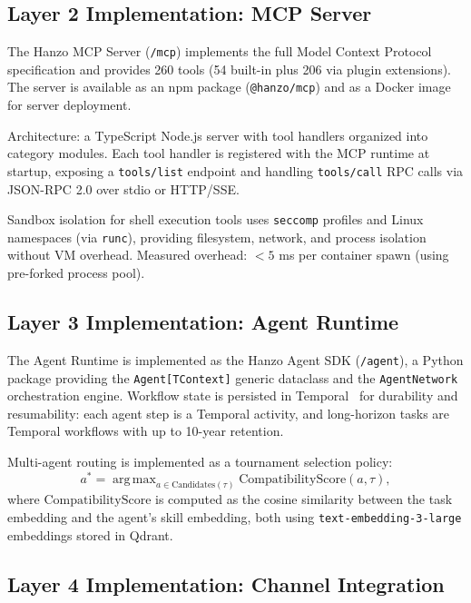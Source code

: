 \documentclass[11pt]{article}
\DeclareMathOperator*{\argmax}{arg\,max}
\begin{document}
\subsection{Layer 2 Implementation: MCP Server}

The Hanzo MCP Server (\texttt{/mcp}) implements the full Model Context
Protocol specification and provides 260 tools (54 built-in plus 206 via
plugin extensions). The server is available as an npm package
(\texttt{@hanzo/mcp}) and as a Docker image for server deployment.

Architecture: a TypeScript Node.js server with tool handlers organized into
category modules. Each tool handler is registered with the MCP runtime at
startup, exposing a \texttt{tools/list} endpoint and handling
\texttt{tools/call} RPC calls via JSON-RPC 2.0 over stdio or HTTP/SSE.

Sandbox isolation for shell execution tools uses
\texttt{seccomp} profiles and Linux namespaces (via \texttt{runc}), providing
filesystem, network, and process isolation without VM overhead. Measured
overhead: $<5$ ms per container spawn (using pre-forked process pool).

\subsection{Layer 3 Implementation: Agent Runtime}

The Agent Runtime is implemented as the Hanzo Agent SDK (\texttt{/agent}),
a Python package providing the \texttt{Agent[TContext]} generic dataclass
and the \texttt{AgentNetwork} orchestration engine. Workflow state is
persisted in Temporal~\cite{temporal2023} for durability and resumability:
each agent step is a Temporal activity, and long-horizon tasks are Temporal
workflows with up to 10-year retention.

Multi-agent routing is implemented as a tournament selection policy:
\begin{equation}
    a^* = \argmax_{a \in \text{Candidates}(\tau)}
          \text{CompatibilityScore}(a, \tau),
\end{equation}
where $\text{CompatibilityScore}$ is computed as the cosine similarity
between the task embedding and the agent's skill embedding, both using
\texttt{text-embedding-3-large} embeddings stored in Qdrant.

\subsection{Layer 4 Implementation: Channel Integration}
\end{document}
